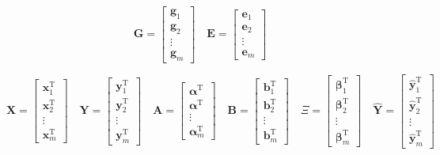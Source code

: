 \documentclass{ctexart}
\begin{document}
	\begin{equation}
		\bm{G}=\begin{bmatrix}
			\bm{g}_1\\\bm{g}_2\\\vdots\\\bm{g}_m
		\end{bmatrix}\quad
		\bm{E}=\begin{bmatrix}
			\bm{e}_1\\\bm{e}_2\\\vdots\\\bm{e}_m
		\end{bmatrix}\quad
	\end{equation}
		
	\begin{equation}
		\bm{X}=\begin{bmatrix}
			\bm{x}_1^\mathrm{T}\\\bm{x}_2^\mathrm{T}\\\vdots\\\bm{x}_m^\mathrm{T}
		\end{bmatrix}\quad
		\bm{Y}=\begin{bmatrix}
			\bm{y}_1^\mathrm{T}\\\bm{y}_2^\mathrm{T}\\\vdots\\\bm{y}_m^\mathrm{T}
		\end{bmatrix}\quad
		\bm{A}=\begin{bmatrix}
			\bm{\alpha}^\mathrm{T}\\\bm{\alpha}^\mathrm{T}\\\vdots\\\bm{\alpha}_m^\mathrm{T}
		\end{bmatrix}\quad
		\bm{B}=\begin{bmatrix}
			\bm{b}_1^\mathrm{T}\\\bm{b}_2^\mathrm{T}\\\vdots\\\bm{b}_m^\mathrm{T}
		\end{bmatrix}\quad
		\bm{\varXi}=\begin{bmatrix}
			\bm{\beta}_1^\mathrm{T}\\\bm{\beta}_2^\mathrm{T}\\\vdots\\\bm{\beta}_m^\mathrm{T}
		\end{bmatrix}\quad
		\hat{\bm{Y}}=\begin{bmatrix}
			\hat{\bm{y}}_1^\mathrm{T}\\\hat{\bm{y}}_2^\mathrm{T}\\\vdots\\\hat{\bm{y}}_m^\mathrm{T}
		\end{bmatrix}
	\end{equation}
\end{document}

